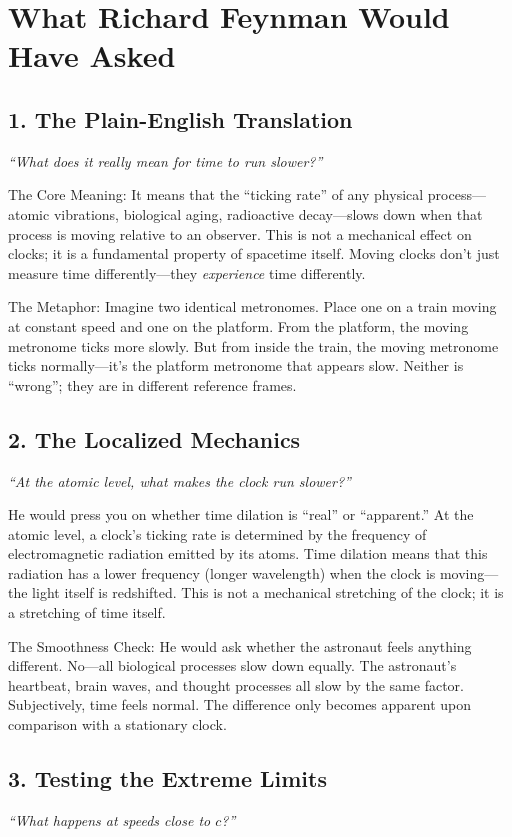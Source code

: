 \documentclass[11pt,openright]{book}
\begin{document}
\section*{What Richard Feynman Would Have Asked}

\subsection*{1. The Plain-English Translation}
\textit{``What does it really mean for time to run slower?''}

The Core Meaning: It means that the ``ticking rate'' of any physical process---atomic vibrations, biological aging, radioactive decay---slows down when that process is moving relative to an observer. This is not a mechanical effect on clocks; it is a fundamental property of spacetime itself. Moving clocks don't just measure time differently---they \emph{experience} time differently.

The Metaphor: Imagine two identical metronomes. Place one on a train moving at constant speed and one on the platform. From the platform, the moving metronome ticks more slowly. But from inside the train, the moving metronome ticks normally---it's the platform metronome that appears slow. Neither is ``wrong''; they are in different reference frames.

\subsection*{2. The Localized Mechanics}
\textit{``At the atomic level, what makes the clock run slower?''}

He would press you on whether time dilation is ``real'' or ``apparent.'' At the atomic level, a clock's ticking rate is determined by the frequency of electromagnetic radiation emitted by its atoms. Time dilation means that this radiation has a lower frequency (longer wavelength) when the clock is moving---the light itself is redshifted. This is not a mechanical stretching of the clock; it is a stretching of time itself.

The Smoothness Check: He would ask whether the astronaut feels anything different. No---all biological processes slow down equally. The astronaut's heartbeat, brain waves, and thought processes all slow by the same factor. Subjectively, time feels normal. The difference only becomes apparent upon comparison with a stationary clock.

\subsection*{3. Testing the Extreme Limits}
\textit{``What happens at speeds close to $c$?''}
\end{document}
